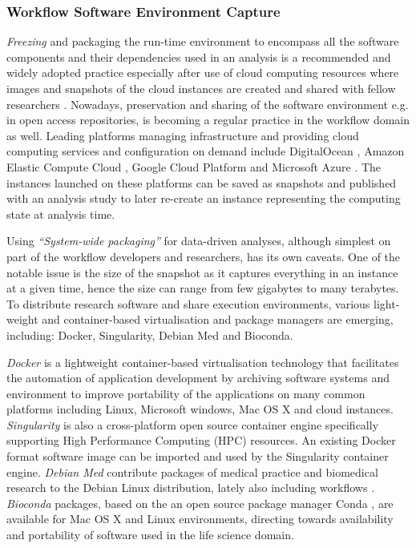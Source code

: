 \documentclass[a4paper,num-refs]{oup-contemporary}
\begin{document}
\subsubsection{\textcolor{black} Workflow Software Environment Capture}
\textit{Freezing} and packaging the run-time environment to encompass all the software components and their dependencies used in an analysis is a recommended and widely adopted practice \citep{cohen2017scientific} especially after use of cloud computing resources where images and snapshots of the cloud instances are created and shared with fellow researchers \citep{howe}. Nowadays, preservation and sharing of the software environment e.g. in open access repositories, is becoming a regular practice in the workflow domain as well. Leading platforms managing infrastructure and providing cloud computing services and configuration on demand include DigitalOcean \citep{DigitalOcean}, Amazon Elastic Compute Cloud \citep{AmazonEC}, Google Cloud Platform \citep{GoogleCl} and Microsoft Azure \citep{Microsof}. The instances launched on these platforms can be saved as snapshots and published with an analysis study to later re-create an instance representing the computing state at analysis time. 

Using \textit{``System-wide packaging''} for data-driven analyses, although simplest on part of the workflow developers and researchers, has its own caveats. One of the notable issue is the size of the snapshot as it captures everything in an instance at a given time, hence the size can range from few gigabytes to many terabytes. To distribute research software and share execution environments, various light-weight and container-based virtualisation and package managers are emerging, including: Docker, Singularity, Debian Med and Bioconda. 

\textit{Docker}\citep{docker} is a lightweight container-based virtualisation technology that facilitates the automation of application development by archiving software systems and environment to improve portability of the applications on many common platforms including Linux, Microsoft windows, Mac OS X and cloud instances. \textit{Singularity}\citep{kurtzer_2017} is also a cross-platform open source container engine specifically supporting High Performance Computing (HPC) resources. An existing Docker format software image can be imported and used by the Singularity container engine. \textit{Debian Med} \citep{debian-med} contribute packages of medical practice and biomedical research to the Debian Linux distribution, lately also including workflows \citep{moller_2017}.  \textit{Bioconda}\citep{Grning2018} packages, based on the an open source package manager Conda \citep{Conda}, are available for Mac OS X and Linux environments, directing towards availability and portability of software used in the life science domain.
\end{document}
